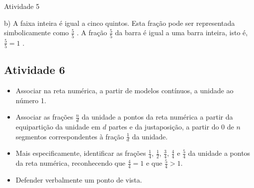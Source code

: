 \begin{multicols}{2}
\begin{resposta*}{Atividade 5}
\begin{center}
\end{center}

\noindent b)   A faixa inteira é igual a cinco quintos. Esta fração pode ser representada simbolicamente como     $\frac{5}{5}$    . A fração     $\frac{5}{5}$     da barra é igual a uma barra inteira, isto é,     $\frac{5}{5}=1$    . 

\end{resposta*}



\subsection{Atividade 6}

\begin{itemize} %
    \item       Associar na reta numérica, a partir de modelos contínuos, a unidade ao número 1.
    \item       Associar as frações       $\frac{n}{d}$       da unidade a pontos da reta numérica a partir da equipartição da unidade em       $d$       partes e da justaposição, a partir do       $0$       de       $n$       segmentos correspondentes à fração       $\frac{1}{d}$       da unidade. 
    \item       Mais especificamente, identificar as frações       $\frac{1}{4}$,       $\frac{1}{2}$,       $\frac{3}{4}$,       $\frac{4}{4}$       e       $\frac{5}{4}$       da unidade a pontos da reta numérica, reconhecendo que       $\frac{4}{4}=1$       e que       $\frac{5}{4}>1$.
    \item       Defender verbalmente um ponto de vista.
\end{itemize} %
  

\end{multicols}
